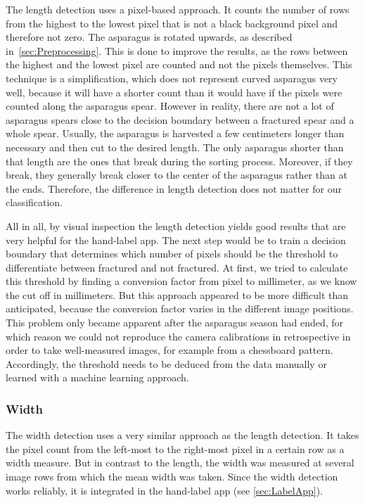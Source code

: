 The length detection uses a pixel-based approach. It counts the number of rows from the highest to the lowest pixel that is not a black background pixel and therefore not zero. The asparagus is rotated upwards, as described in~\autoref{sec:Preprocessing}. This is done to improve the results, as the rows between the highest and the lowest pixel are counted and not the pixels themselves. This technique is a simplification, which does not represent curved asparagus very well, because it will have a shorter count than it would have if the pixels were counted along the asparagus spear. However in reality, there are not a lot of asparagus spears close to the decision boundary between a fractured spear and a whole spear. Usually, the asparagus is harvested a few centimeters longer than necessary and then cut to the desired length. The only asparagus shorter than that length are the ones that break during the sorting process. Moreover, if they break, they generally break closer to the center of the asparagus rather than at the ends. Therefore, the difference in length detection does not matter for our classification.

\bigskip
All in all, by visual inspection the length detection yields good results that are very helpful for the hand-label app. The next step would be to train a decision boundary that determines which number of pixels should be the threshold to differentiate between fractured and not fractured. At first, we tried to calculate this threshold by finding a conversion factor from pixel to millimeter, as we know the cut off in millimeters. But this approach appeared to be more difficult than anticipated, because the conversion factor varies in the different image positions. This problem only became apparent after the asparagus season had ended, for which reason we could not reproduce the camera calibrations in retrospective in order to take well-measured images, for example from a chessboard pattern. Accordingly, the threshold needs to be deduced from the data manually or learned with a machine learning approach.

\subsubsection{Width}
\label{subsec:Width}

The width detection uses a very similar approach as the length detection. It takes the pixel count from the left-most to the right-most pixel in a certain row as a width measure. But in contrast to the length, the width was measured at several image rows from which the mean width was taken. Since the width detection works reliably, it is integrated in the hand-label app (see \autoref{sec:LabelApp}).

